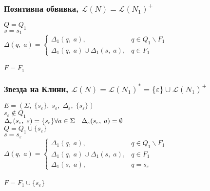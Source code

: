\documentclass[12pt]{article}
\newcommand{\Lang}{\mathcal{L}}
\begin{document}
\subsubsection*{Позитивна обвивка, $\Lang(N) = \Lang(N_1)^+$}

$Q = Q_1$ \\

$s = s_1$ \\

$\Delta(q, \; a) = \begin{cases}
    \Delta_1(q, \; a), & q \in Q_1 \backslash F_1 \\
    \Delta_1(q, \; a) \cup \Delta_1(s, \; a), & q \in F_1
\end{cases}$ \\\\

$F = F_1$

\subsubsection*{Звезда на Клини, $\Lang(N) = \Lang(N_1)^* = \{\varepsilon\} \cup \Lang(N_1)^+$}

$E = (\Sigma, \; \{s_\varepsilon\}, \; s_\varepsilon, \; \Delta_\varepsilon, \; \{s_\varepsilon\})$ \\

$s_\varepsilon \notin Q_1$ \\

$\Delta_\varepsilon(s_\varepsilon, \; \varepsilon) = \{s_\varepsilon\} \\\\
\forall a \in \Sigma \quad \Delta_\varepsilon(s_\varepsilon, \; a) = \emptyset $ \\

$Q = Q_1 \cup \{s_\varepsilon\}$ \\

$s = s_\varepsilon$ \\

$\Delta(q, \; a) = \begin{cases}
    \Delta_1(q, \; a), & q \in Q_1 \backslash F_1 \\
    \Delta_1(q, \; a) \cup \Delta_1(s, \; a), & q \in F_1 \\ 
    \Delta_1(s, \; a), & q = s_\varepsilon
\end{cases}$ \\\\

$F = F_1 \cup \{s_\varepsilon\}$
\end{document}
